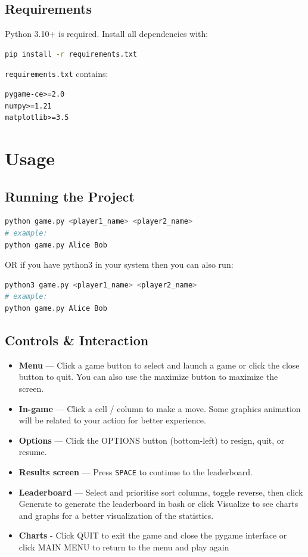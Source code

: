 \documentclass[12pt, a4paper]{article}
\begin{document}
\subsection{Requirements}
Python 3.10+ is required. Install all dependencies with:

\begin{lstlisting}[language=bash]
pip install -r requirements.txt
\end{lstlisting}

\noindent\texttt{requirements.txt} contains:

\begin{lstlisting}
pygame-ce>=2.0
numpy>=1.21
matplotlib>=3.5
\end{lstlisting}

\section{Usage}

\subsection{Running the Project}

\begin{lstlisting}[language=bash]
python game.py <player1_name> <player2_name>
# example:
python game.py Alice Bob
\end{lstlisting}

OR if you have python3 in your system then you can also run:
\begin{lstlisting}[language=bash]
python3 game.py <player1_name> <player2_name>
# example:
python game.py Alice Bob
\end{lstlisting}

\subsection{Controls \& Interaction}
\begin{itemize}
    \item \textbf{Menu} — Click a game button to select and launch a game or click the close button to quit. You can also use the maximize button to maximize the screen.
    \item \textbf{In-game} — Click a cell / column to make a move. Some graphics animation will be related to your action for better experience.
    \item \textbf{Options} — Click the OPTIONS button (bottom-left) to resign,
          quit, or resume.
    \item \textbf{Results screen} — Press \texttt{SPACE} to continue to
          the leaderboard.
    \item \textbf{Leaderboard} — Select and prioritise sort columns,
          toggle reverse, then click Generate to generate the leaderboard in bash or click Visualize to see charts and graphs for a better visualization of the statistics.
    \item \textbf{Charts} - Click QUIT to exit the game and close the pygame interface or click MAIN MENU to return to the menu and play again
\end{itemize}
\newpage
\end{document}
